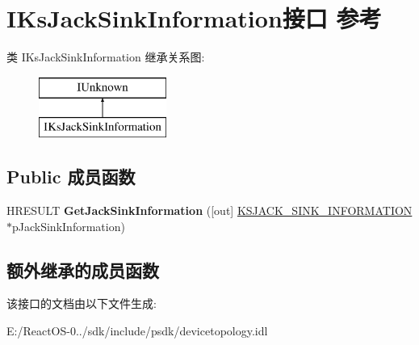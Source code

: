 \hypertarget{interface_i_ks_jack_sink_information}{}\section{I\+Ks\+Jack\+Sink\+Information接口 参考}
\label{interface_i_ks_jack_sink_information}
类 I\+Ks\+Jack\+Sink\+Information 继承关系图\+:\begin{figure}[H]
\begin{center}
\leavevmode
\includegraphics[height=2.000000cm]{interface_i_ks_jack_sink_information}
\end{center}
\end{figure}
\subsection*{Public 成员函数}
\begin{DoxyCompactItemize}
\item 
\mbox{\label{interface_i_ks_jack_sink_information_a8fa31dc42979ec0ce8fb3db7bf346113}} 
H\+R\+E\+S\+U\+LT {\bfseries Get\+Jack\+Sink\+Information} (\mbox{[}out\mbox{]} \hyperlink{struct__tag_k_s_j_a_c_k___s_i_n_k___i_n_f_o_r_m_a_t_i_o_n}{K\+S\+J\+A\+C\+K\+\_\+\+S\+I\+N\+K\+\_\+\+I\+N\+F\+O\+R\+M\+A\+T\+I\+ON} $\ast$p\+Jack\+Sink\+Information)
\end{DoxyCompactItemize}
\subsection*{额外继承的成员函数}


该接口的文档由以下文件生成\+:\begin{DoxyCompactItemize}
\item 
E\+:/\+React\+O\+S-\/0../sdk/include/psdk/devicetopology.\+idl\end{DoxyCompactItemize}
